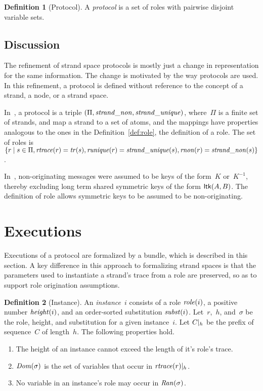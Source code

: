 \documentclass[12pt]{article}
\theoremstyle{definition}
\newtheorem{defn}{Definition}[section]
\begin{document}
\begin{defn}[Protocol]
A \emph{protocol} is a set of roles with pairwise disjoint variable sets.
\end{defn}

\subsection*{Discussion}

The refinement of strand space protocols is mostly just a change in
representation for the same information.  The change is motivated by
the way protocols are used.  In this refinement, a protocol is defined
without reference to the concept of a strand, a node, or a strand
space.

In~\cite{DoghmiGuttmanThayer07}, a protocol is a triple
$(\Pi,\operatorname{\mathit{strand\_non}},\operatorname{\mathit{strand\_unique}})$, where~$\Pi$ is a finite
set of strands,  and  map a strand
to a set of atoms, and the mappings have properties analogous to the
ones in the Definition~\ref{def:role}, the definition of a role.  The
set of roles is $\{r\mid s\in\Pi, \operatorname{\mathit{rtrace}}(r)=\operatorname{\mathit{tr}}(s),
\operatorname{\mathit{runique}}(r)=\operatorname{\mathit{strand\_unique}}(s), \operatorname{\mathit{rnon}}(r)=
\operatorname{\mathit{strand\_non}}(s)\}$.

In~\cite{DoghmiGuttmanThayer07}, non-originating messages were assumed
to be keys of the form~$K$ or~$K^{-1}$, thereby excluding long term
shared symmetric keys of the form $\operatorname{\mathsf{ltk}}(A,B)$.  The definition of
role allows symmetric keys to be assumed to be non-originating.

\section{Executions}\label{sec:executions}

Executions of a protocol are formalized by a bundle, which is
described in this section.  A key difference in this approach to
formalizing strand spaces is that the parameters used to instantiate a
strand's trace from a role are preserved, so as to support role
origination assumptions.

\begin{defn}[Instance]
An \emph{instance}~$i$ consists of a role $\operatorname{\mathit{role}}(i)$, a positive
number $\operatorname{\mathit{height}}(i)$, and an order-sorted substitution
$\operatorname{\mathit{subst}}(i)$.  Let~$r$,~$h$, and~$\sigma$ be the role, height, and
substitution for a given instance~$i$.  Let $C|_{h}$ be the prefix of
sequence~$C$ of length~$h$.  The following properties hold.
\begin{enumerate}
\item The height of an instance cannot exceed the length of it's
  role's trace.
\item $\operatorname{\mathit{Dom}}(\sigma)$ is the set of variables that occur in
  $\operatorname{\mathit{rtrace}}(r)|_{h}$.
\item No variable in an instance's role may occur in
  $\operatorname{\mathit{Ran}}(\sigma)$.
\end{enumerate}
\end{defn}
\end{document}
